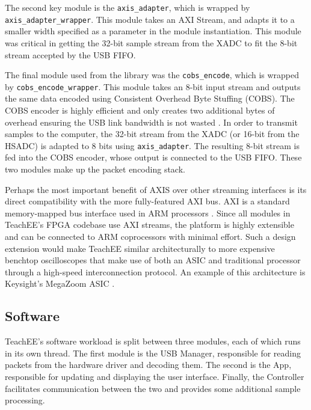 \documentclass[letterpaper,11pt]{article}
\newcommand{\code}[1]{\texttt{#1}}
\begin{document}
The second key module is the \code{axis_adapter}, which is wrapped by
\code{axis_adapter_wrapper}. This module takes an AXI Stream, and adapts it to a
smaller width specified as a parameter in the module instantiation. This module
was critical in getting the 32-bit sample stream from the XADC to fit the 8-bit
stream accepted by the USB FIFO.

The final module used from the library was the \code{cobs_encode}, which is
wrapped by \code{cobs_encode_wrapper}. This module takes an 8-bit input stream
and outputs the same data encoded using Consistent Overhead Byte Stuffing
(COBS). The COBS encoder is highly efficient and only creates two additional
bytes of overhead ensuring the USB link bandwidth is not wasted \cite{cobs}.
In order to transmit samples to the computer, the 32-bit stream from the XADC
(or 16-bit from the HSADC) is adapted to 8 bits using \code{axis_adapter}. The
resulting 8-bit stream is fed into the COBS encoder, whose output is connected
to the USB FIFO. These two modules make up the packet encoding stack.

Perhaps the most important benefit of AXIS over other streaming interfaces is
its direct compatibility with the more fully-featured AXI bus. AXI is a standard
memory-mapped bus interface used in ARM processors \cite{axi_spec}. Since all
modules in TeachEE's FPGA codebase use AXI streams, the platform is highly
extensible and can be connected to ARM coprocessors with minimal effort. Such a
design extension would make TeachEE similar architecturally to more expensive
benchtop oscilloscopes that make use of both an ASIC and traditional processor
through a high-speed interconnection protocol. An example of this architecture
is Keysight's MegaZoom ASIC \cite{keysight_megazoom}.

\subsection{Software} \label{sec:software-impl} %
TeachEE's software workload is split between three modules, each of which runs in its
own thread. The first module is the USB Manager, responsible for reading packets from the
hardware driver and decoding them. The second is the App, responsible for updating and
displaying the user interface. Finally, the Controller facilitates communication between
the two and provides some additional sample processing.
\end{document}
